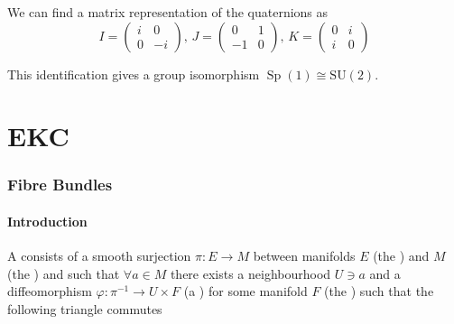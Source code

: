 \documentclass{article}
\begin{document}
We can find a matrix representation of the quaternions as 
\[
I = \begin{pmatrix}
i & 0 \\ 0 & -i\end{pmatrix}, \, J = \begin{pmatrix}
0 & 1 \\ -1 & 0 \end{pmatrix}, \, K = \begin{pmatrix}
0 & i \\ i & 0  \end{pmatrix}
\]
\begin{lemma}
	This identification gives a group isomorphism $\operatorname{Sp}(1) \cong \operatorname{SU(2)}$. 
\end{lemma}
\part{EKC}
\section{Fibre Bundles}
\subsection{Introduction}
\begin{definition}
	A  consists of a smooth surjection $\pi : E \to M$ between manifolds $E$ (the ) and $M$ (the ) and such that $\forall a \in M$ there exists a neighbourhood $U \ni a$ and a diffeomorphism $\varphi : \pi^{-1} \to U \times F$ (a ) for some manifold $F$ (the ) such that the following triangle commutes 
	\begin{center}
	\end{center}
\end{definition}
\end{document}
